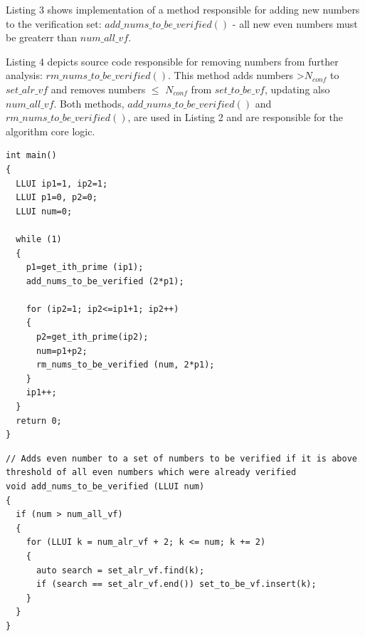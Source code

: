 \documentclass[10pt,twocolumn]{article}
\begin{document}
Listing 3 shows implementation of a method responsible for adding new numbers to the verification set: $add\_nums\_to\_be\_verified()$ - all new even numbers must be greaterr than $num\_all\_vf$. \par
Listing 4 depicts source code responsible for removing numbers from further analysis: $rm\_nums\_to\_be\_verified()$. This method adds numbers \textgreater $N_{conf}$ to $set\_alr\_vf$ and removes numbers $\leq$ $N_{conf}$ from $set\_to\_be\_vf$, updating also $num\_all\_vf$. Both methods, $add\_nums\_to\_be\_verified()$ and $rm\_nums\_to\_be\_verified()$, are used in Listing 2 and are responsible for the algorithm core logic. \par

\lstset{language=C++}
\lstset{breaklines=true}
\lstset{frame=shadowbox}
\lstset{caption=Main program loop}
\begin{lstlisting}[linewidth=8.7cm]
int main()
{
  LLUI ip1=1, ip2=1;
  LLUI p1=0, p2=0;
  LLUI num=0;
	
  while (1)
  {	
    p1=get_ith_prime (ip1);
    add_nums_to_be_verified (2*p1);
    
    for (ip2=1; ip2<=ip1+1; ip2++)
    {
      p2=get_ith_prime(ip2);
      num=p1+p2;
      rm_nums_to_be_verified (num, 2*p1);
    }
    ip1++;
  }
  return 0;
}
\end{lstlisting}

\lstset{language=C++}
\lstset{breaklines=true}
\lstset{frame=shadowbox}
\lstset{caption=Adding new number to further analysis}
\begin{lstlisting}[linewidth=8.7cm]
// Adds even number to a set of numbers to be verified if it is above threshold of all even numbers which were already verified
void add_nums_to_be_verified (LLUI num)
{
  if (num > num_all_vf)
  {
    for (LLUI k = num_alr_vf + 2; k <= num; k += 2)
    {
      auto search = set_alr_vf.find(k);
      if (search == set_alr_vf.end()) set_to_be_vf.insert(k);
    }
  }
}
\end{lstlisting}
\end{document}
